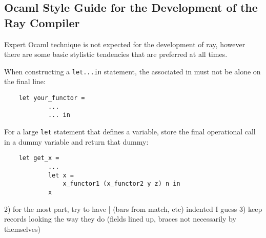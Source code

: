 \subsection*{Ocaml Style Guide for the Development of the Ray Compiler}

Expert Ocaml technique is not expected for the development of ray, however there are some basic stylistic tendencies that are preferred at all times.

When constructing a \verb|let...in| statement, the associated in must not be alone on the final line:
\begin{lstlisting}
    let your_functor =
    	    ...
    	    ... in
\end{lstlisting}

For a large \verb|let| statement that defines a variable, store the final operational call in a dummy variable and return that dummy:
\begin{lstlisting}
    let get_x =
    	    ...
    	    let x =
    	        x_functor1 (x_functor2 y z) n in
    	    x
\end{lstlisting}

2) for the most part, try to have | (bars from match, etc) indented
I guess 3) keep records looking the way they do (fields lined up, braces not necessarily by themselves)